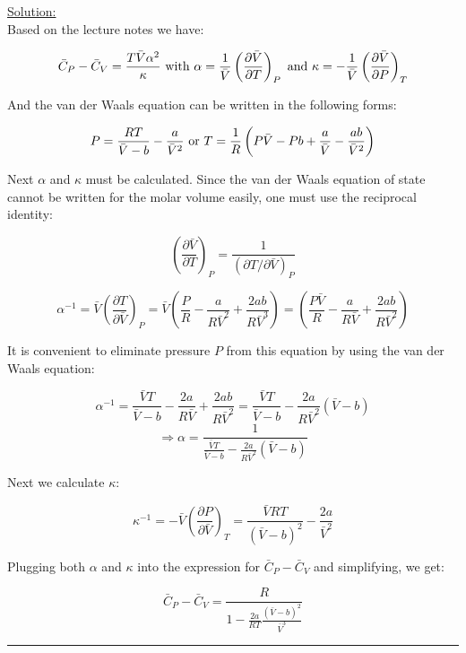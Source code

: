 \noindent
\underline{Solution:}\\

Based on the lecture notes we have:

$$\bar{C}_P - \bar{C}_V = \frac{T\bar{V}\alpha^2}{\kappa}\textnormal{ with }\alpha = \frac{1}{\bar{V}}\left(\frac{\partial\bar{V}}{\partial T}\right)_P\textnormal{ and }\kappa = -\frac{1}{\bar{V}}\left(\frac{\partial\bar{V}}{\partial P}\right)_T$$

And the van der Waals equation can be written in the following forms:

$$P = \frac{RT}{\bar{V} - b} - \frac{a}{\bar{V}^2}\textnormal{ or }T = \frac{1}{R}\left(P\bar{V} - Pb + \frac{a}{\bar{V}} - \frac{ab}{\bar{V}^2}\right)$$

Next $\alpha$ and $\kappa$ must be calculated. Since the van der Waals equation of state cannot be written for the molar volume easily, one must use the reciprocal identity:

$$\left(\frac{\partial\bar{V}}{\partial T}\right)_P = \frac{1}{\left(\partial T / \partial\bar{V}\right)_P}$$

$$\alpha^{-1} = \bar{V}\left(\frac{\partial T}{\partial\bar{V}}\right)_P = \bar{V}\left(\frac{P}{R} - \frac{a}{R\bar{V}^2} + \frac{2ab}{R\bar{V}^3}\right) = \left(\frac{P\bar{V}}{R} - \frac{a}{R\bar{V}} + \frac{2ab}{R\bar{V}^2}\right)$$

It is convenient to eliminate pressure $P$ from this equation by using the van der Waals equation:

$$\alpha^{-1} = \frac{\bar{V}T}{\bar{V} - b} - \frac{2a}{R\bar{V}} + \frac{2ab}{R\bar{V}^2} = \frac{\bar{V}T}{\bar{V} - b} - \frac{2a}{R\bar{V}^2}\left(\bar{V} - b\right)$$
$$\Rightarrow \alpha = \frac{1}{\frac{\bar{V}T}{\bar{V} - b} - \frac{2a}{R\bar{V}^2}\left(\bar{V} - b\right)}$$

Next we calculate $\kappa$:

$$\kappa^{-1} = -\bar{V}\left(\frac{\partial P}{\partial\bar{V}}\right)_T = \frac{\bar{V}RT}{\left(\bar{V} - b\right)^2} - \frac{2a}{\bar{V}^2}$$

Plugging both $\alpha$ and $\kappa$ into the expression for $\bar{C}_P - \bar{C}_V$ and simplifying, we get:

$$\bar{C}_P - \bar{C}_V = \frac{R}{1 - \frac{2a}{RT}\frac{\left(\bar{V} - b\right)^2}{\bar{V}^3}}$$

\hrule\vspace{0.5cm}

